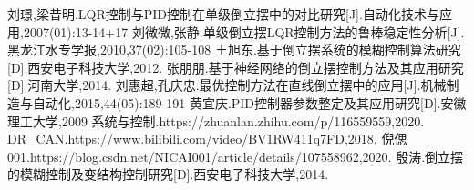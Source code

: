 \documentclass[degree=master,bibtype=numeric]{tongjithesis}
\begin{document}
\graphicspath{{figures/}}


\frontmatter

\makecover


\tableofcontents
%


\mainmatter



\backmatter

\begin{acknowledgement}

\end{acknowledgement}

    \newpage


	\begin{thebibliography}{99}
	刘璟,梁昔明.LQR控制与PID控制在单级倒立摆中的对比研究[J].自动化技术与应用,2007(01):13-14+17
	刘微微,张静.单级倒立摆LQR控制方法的鲁棒稳定性分析[J].黑龙江水专学报,2010,37(02):105-108
	王旭东.基于倒立摆系统的模糊控制算法研究[D].西安电子科技大学,2012.
	张朋朋.基于神经网络的倒立摆控制方法及其应用研究[D].河南大学,2014.
	刘惠超,孔庆忠.最优控制方法在直线倒立摆中的应用[J].机械制造与自动化,2015,44(05):189-191
	黄宜庆.PID控制器参数整定及其应用研究[D].安徽理工大学,2009
	系统与控制.https://zhuanlan.zhihu.com/p/116559559,2020.  %
	DR\_CAN.https://www.bilibili.com/video/BV1RW411q7FD,2018.  %
	倪偲001.https://blog.csdn.net/NICAI001/article/details/107558962,2020. %
	殷涛.倒立摆的模糊控制及变结构控制研究[D].西安电子科技大学,2014.
	\end{thebibliography}


\begin{appendix}

\end{appendix}

%
\end{document}
